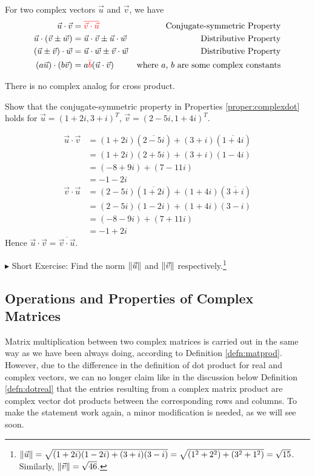 \begin{proper}
\label{proper:complexdot}
For two complex vectors $\vec{u}$ and $\vec{v}$, we have
\begin{align*}
\vec{u} \cdot \vec{v} &= \textcolor{red}{\overline{\vec{v} \cdot \vec{u}}} &\text{Conjugate-symmetric Property} \\
\vec{u} \cdot (\vec{v} \pm \vec{w}) &= \vec{u} \cdot \vec{v} \pm \vec{u} \cdot \vec{w} &\text{Distributive Property} \\
(\vec{u} \pm \vec{v}) \cdot \vec{w} &= \vec{u} \cdot \vec{w} \pm \vec{v} \cdot \vec{w} &\text{Distributive Property} \\
(a\vec{u}) \cdot (b\vec{v}) &= a\textcolor{red}{\bar{b}}(\vec{u} \cdot \vec{v}) &\text{where $a$, $b$ are some complex constants}    
\end{align*}
\end{proper}
There is no complex analog for cross product.
\begin{exmp}
Show that the conjugate-symmetric property in Properties \ref{proper:complexdot} holds for $\vec{u} = (1+2i, 3+i)^T$, $\vec{v} = (2-5i, 1+4i)^T$.
\end{exmp}
\begin{solution}
\begin{align*}
\vec{u} \cdot \vec{v} &= (1+2i)(\overline{2-5i}) + (3+i)(\overline{1+4i}) \\
&= (1+2i)(2+5i) + (3+i)(1-4i) \\
&= (-8+9i) + (7-11i) \\
&= -1-2i 
\end{align*}
\begin{align*}
\vec{v} \cdot \vec{u} &= (2-5i)(\overline{1+2i}) + (1+4i)(\overline{3+i}) \\
&= (2-5i)(1-2i) + (1+4i)(3-i) \\
&= (-8-9i) + (7+11i) \\
&= -1+2i 
\end{align*}
Hence $\vec{u} \cdot \vec{v} = \overline{\vec{v} \cdot \vec{u}}$.
\end{solution}

$\blacktriangleright$ Short Exercise: Find the norm $\norm{\vec{u}}$ and $\norm{\vec{v}}$ respectively.\footnote{$\norm{\vec{u}} = \sqrt{(1+2i)(1-2i) + (3+i)(3-i)} = \sqrt{(1^2 + 2^2) + (3^2 + 1^2)} = \sqrt{15}$. Similarly, $\norm{\vec{v}} = \sqrt{46}$.}

\subsection{Operations and Properties of Complex Matrices}
Matrix multiplication between two complex matrices is carried out in the same way as we have been always doing, according to Definition \ref{defn:matprod}. However, due to the difference in the definition of dot product for real and complex vectors, we can no longer claim like in the discussion below Definition \ref{defn:dotreal} that the entries resulting from a complex matrix product are complex vector dot products between the corresponding rows and columns. To make the statement work again, a minor modification is needed, as we will see soon. 

